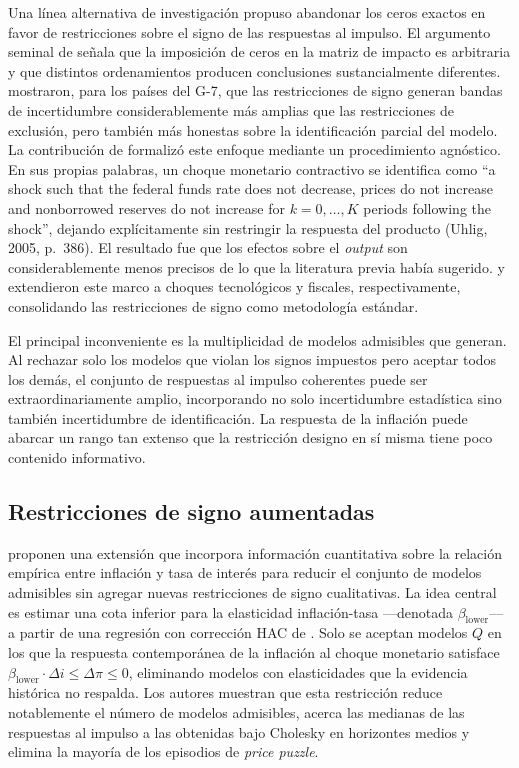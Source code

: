 \documentclass[12pt,a4paper]{article}
\newcommand{\blower}{\beta_{\text{lower}}}
\begin{document}
Una línea alternativa de investigación propuso abandonar los ceros exactos en favor de
restricciones sobre el signo de las respuestas al impulso.
El argumento seminal de \citet{faust1998} señala que la imposición de ceros en la matriz
de impacto es arbitraria y que distintos ordenamientos producen conclusiones
sustancialmente diferentes.
\citet{canovadenicolo2002} mostraron, para los países del G-7, que las restricciones de
signo generan bandas de incertidumbre considerablemente más amplias que las restricciones
de exclusión, pero también más honestas sobre la identificación parcial del modelo.
La contribución de \citet{uhlig2005} formalizó este enfoque mediante un procedimiento
agnóstico. En sus propias palabras, un choque monetario contractivo se identifica como
``a shock such that the federal funds rate does not decrease, prices do not increase
and nonborrowed reserves do not increase for $k = 0,\ldots,K$ periods following the
shock'', dejando explícitamente sin restringir la respuesta del producto
(Uhlig, 2005, p.\ 386).
El resultado fue que los efectos sobre el \textit{output} son considerablemente
menos precisos de lo que la literatura previa había sugerido.
\citet{dedolaneri2006} y \citet{mountforduhlig2009} extendieron este marco a choques
tecnológicos y fiscales, respectivamente, consolidando las restricciones de signo como metodología estándar.

El principal inconveniente es la multiplicidad de modelos admisibles que generan.
Al rechazar solo los modelos que violan los signos impuestos pero aceptar todos los
demás, el conjunto de respuestas al impulso coherentes puede ser extraordinariamente
amplio, incorporando no solo incertidumbre estadística sino también incertidumbre de
identificación. La respuesta de la inflación puede abarcar un rango tan extenso que la restricción designo en sí misma tiene poco contenido informativo.

\subsection{Restricciones de signo aumentadas}

\citet{carrilloelizondo2018} proponen una extensión que incorpora información cuantitativa
sobre la relación empírica entre inflación y tasa de interés para reducir el conjunto de
modelos admisibles sin agregar nuevas restricciones de signo cualitativas.
La idea central es estimar una cota inferior para la elasticidad inflación-tasa
—denotada $\blower$— a partir de una regresión con corrección HAC de \citet{neweywest1987}.
Solo se aceptan modelos $Q$ en los que la respuesta contemporánea de la inflación al
choque monetario satisface $\blower \cdot \Delta i \leq \Delta\pi \leq 0$,
eliminando modelos con elasticidades que la evidencia histórica no respalda.
Los autores muestran que esta restricción reduce notablemente el número de modelos
admisibles, acerca las medianas de las respuestas al impulso a las obtenidas bajo
Cholesky en horizontes medios y elimina la mayoría de los episodios de \textit{price
puzzle}.
\end{document}
